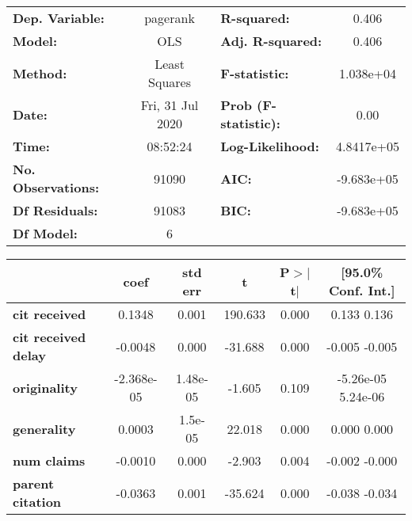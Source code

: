 \begin{center}
\begin{tabular}{lclc}
\toprule
\textbf{Dep. Variable:}     &     pagerank     & \textbf{  R-squared:         } &       0.406    \\
\textbf{Model:}             &       OLS        & \textbf{  Adj. R-squared:    } &       0.406    \\
\textbf{Method:}            &  Least Squares   & \textbf{  F-statistic:       } &   1.038e+04    \\
\textbf{Date:}              & Fri, 31 Jul 2020 & \textbf{  Prob (F-statistic):} &       0.00     \\
\textbf{Time:}              &     08:52:24     & \textbf{  Log-Likelihood:    } &   4.8417e+05   \\
\textbf{No. Observations:}  &       91090      & \textbf{  AIC:               } &   -9.683e+05   \\
\textbf{Df Residuals:}      &       91083      & \textbf{  BIC:               } &   -9.683e+05   \\
\textbf{Df Model:}          &           6      & \textbf{                     } &                \\
\bottomrule
\end{tabular}
\begin{tabular}{lccccc}
                            & \textbf{coef} & \textbf{std err} & \textbf{t} & \textbf{P$>$$|$t$|$} & \textbf{[95.0\% Conf. Int.]}  \\
\midrule
\textbf{cit received}       &       0.1348  &        0.001     &   190.633  &         0.000        &         0.133     0.136       \\
\textbf{cit received delay} &      -0.0048  &        0.000     &   -31.688  &         0.000        &        -0.005    -0.005       \\
\textbf{originality}        &   -2.368e-05  &     1.48e-05     &    -1.605  &         0.109        &     -5.26e-05  5.24e-06       \\
\textbf{generality}         &       0.0003  &      1.5e-05     &    22.018  &         0.000        &         0.000     0.000       \\
\textbf{num claims}         &      -0.0010  &        0.000     &    -2.903  &         0.004        &        -0.002    -0.000       \\
\textbf{parent citation}    &      -0.0363  &        0.001     &   -35.624  &         0.000        &        -0.038    -0.034       \\

\end{tabular}
\end{center}
